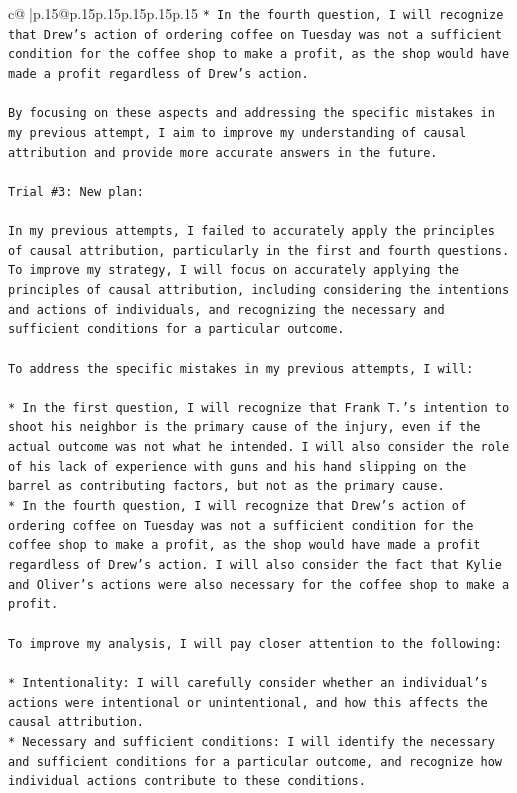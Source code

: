 \documentclass{article}
\begin{document}
{\begin{supertabular}{c@{$\;$}|p{.15\linewidth}@{}p{.15\linewidth}p{.15\linewidth}p{.15\linewidth}p{.15\linewidth}p{.15\linewidth}}
{{{\texttt{* In the fourth question, I will recognize that Drew's action of ordering coffee on Tuesday was not a sufficient condition for the coffee shop to make a profit, as the shop would have made a profit regardless of Drew's action.} \\
\\ 
\texttt{By focusing on these aspects and addressing the specific mistakes in my previous attempt, I aim to improve my understanding of causal attribution and provide more accurate answers in the future.} \\
\\ 
\texttt{Trial \#3: New plan: } \\
\\ 
\texttt{In my previous attempts, I failed to accurately apply the principles of causal attribution, particularly in the first and fourth questions. To improve my strategy, I will focus on accurately applying the principles of causal attribution, including considering the intentions and actions of individuals, and recognizing the necessary and sufficient conditions for a particular outcome.} \\
\\ 
\texttt{To address the specific mistakes in my previous attempts, I will:} \\
\\ 
\texttt{* In the first question, I will recognize that Frank T.'s intention to shoot his neighbor is the primary cause of the injury, even if the actual outcome was not what he intended. I will also consider the role of his lack of experience with guns and his hand slipping on the barrel as contributing factors, but not as the primary cause.} \\
\texttt{* In the fourth question, I will recognize that Drew's action of ordering coffee on Tuesday was not a sufficient condition for the coffee shop to make a profit, as the shop would have made a profit regardless of Drew's action. I will also consider the fact that Kylie and Oliver's actions were also necessary for the coffee shop to make a profit.} \\
\\ 
\texttt{To improve my analysis, I will pay closer attention to the following:} \\
\\ 
\texttt{* Intentionality: I will carefully consider whether an individual's actions were intentional or unintentional, and how this affects the causal attribution.} \\
\texttt{* Necessary and sufficient conditions: I will identify the necessary and sufficient conditions for a particular outcome, and recognize how individual actions contribute to these conditions.} \\
}}}
\end{supertabular}}
\end{document}
